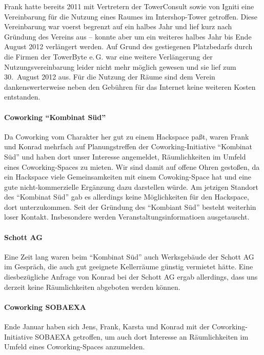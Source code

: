 \documentclass[10pt,DIV16]{scrartcl}
\begin{document}
Frank hatte bereits 2011 mit Vertretern der TowerConsult sowie
von Igniti eine Vereinbarung für die Nutzung eines Raumes im
Intershop-Tower getroffen. Diese Vereinbarung war voerst begrenzt
auf ein halbes Jahr und lief kurz nach Gründung des Vereins aus --
konnte aber um ein weiteres halbes Jahr bis Ende August 2012
verlängert werden. Auf Grund des gestiegenen Platzbedarfs durch die
Firmen der TowerByte e.\,G. war eine weitere Verlängerung der
Nutzungsvereinbarung leider nicht mehr möglich gewesen und sie
lief zum 30.~August 2012 aus. Für die Nutzung der Räume sind dem
Verein dankenswerterweise neben den Gebühren für das Internet keine
weiteren Kosten entstanden.

\paragraph{Coworking ``Kombinat Süd''}

Da Coworking vom Charakter her gut zu einem Hackspace paßt, waren
Frank und Konrad mehrfach auf Planungstreffen der
Coworking-Initiative "`Kombinat Süd"' und haben dort unser Interesse
angemeldet, Räumlichkeiten im Umfeld eines Coworking-Spaces zu
mieten.  Wir sind damit auf offene Ohren gestoßen, da ein Hackspace
viele Gemeinsamkeiten mit einem Cowoking-Space hat und eine gute
nicht-kommerzielle Ergänzung dazu darstellen würde.  Am jetzigen
Standort des "`Kombinat Süd"' gab es allerdings keine Möglichkeiten
für den Hackspace, dort unterzukommen. Seit der Gründung des
"`Kombiant Süd"' besteht weiterhin loser Kontakt.  Insbesondere
werden Veranstaltungsinformatioen ausgetauscht.

\paragraph{Schott AG}

Eine Zeit lang waren beim "`Kombinat Süd"' auch Werksgebäude der Schott AG im
Gespräch, die auch gut geeignete Kellerräume günstig vermietet hätte.  Eine
diesbezügliche Anfrage von Konrad bei der Schott AG ergab allerdings, dass uns
derzeit keine Räumlichkeiten abgeboten werden können.

\paragraph{Coworking SOBAEXA}

Ende Januar haben sich Jens, Frank, Karsta und Konrad mit der
Coworking-Initiative SOBAEXA getroffen, um auch dort Interesse an
Räumlichkeiten im Umfeld eines Coworking-Spaces anzumelden.
\end{document}
